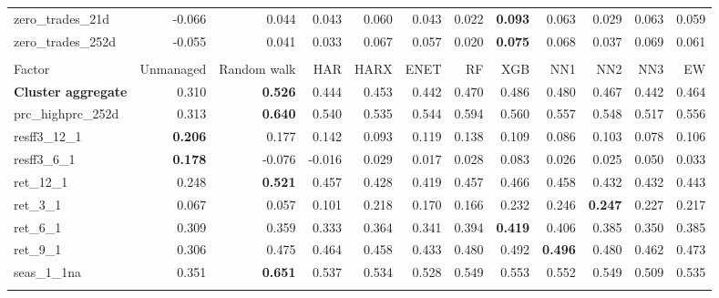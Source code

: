 \begin{landscape}
\begin{longtable}{>{\raggedright\arraybackslash}p{2.6cm}rrrrrrrrrrr}
zero\_trades\_21d & -0.066 & 0.044 & 0.043 & \cellcolor{blue!10}0.060 & 0.043 & 0.022 & \textbf{\cellcolor{blue!10}0.093} & \cellcolor{blue!10}0.063 & 0.029 & \cellcolor{blue!10}0.063 & \cellcolor{blue!10}0.059 \\
zero\_trades\_252d & -0.055 & 0.041 & 0.033 & \cellcolor{blue!10}0.067 & \cellcolor{blue!10}0.057 & 0.020 & \textbf{\cellcolor{blue!10}0.075} & \cellcolor{blue!10}0.068 & 0.037 & \cellcolor{blue!10}0.069 & \cellcolor{blue!10}0.061 \\
\hline
\multicolumn{12}{@{}l}{\textit{Panel F. Momentum}} \\
\hline
Factor & Unmanaged & Random walk & HAR & HARX & ENET & RF & XGB & NN1 & NN2 & NN3 & EW \\
\hline
\textbf{Cluster aggregate} & 0.310 & \textbf{0.526} & 0.444 & 0.453 & 0.442 & 0.470 & 0.486 & 0.480 & 0.467 & 0.442 & 0.464 \\
prc\_highprc\_252d & 0.313 & \textbf{0.640} & 0.540 & 0.535 & 0.544 & 0.594 & 0.560 & 0.557 & 0.548 & 0.517 & 0.556 \\
resff3\_12\_1 & \textbf{0.206} & 0.177 & 0.142 & 0.093 & 0.119 & 0.138 & 0.109 & 0.086 & 0.103 & 0.078 & 0.106 \\
resff3\_6\_1 & \textbf{0.178} & -0.076 & -0.016 & 0.029 & 0.017 & 0.028 & 0.083 & 0.026 & 0.025 & 0.050 & 0.033 \\
ret\_12\_1 & 0.248 & \textbf{0.521} & 0.457 & 0.428 & 0.419 & 0.457 & 0.466 & 0.458 & 0.432 & 0.432 & 0.443 \\
ret\_3\_1 & 0.067 & 0.057 & \cellcolor{blue!10}0.101 & \cellcolor{blue!10}0.218 & \cellcolor{blue!10}0.170 & \cellcolor{blue!10}0.166 & \cellcolor{blue!10}0.232 & \cellcolor{blue!10}0.246 & \textbf{\cellcolor{blue!10}0.247} & \cellcolor{blue!10}0.227 & \cellcolor{blue!10}0.217 \\
ret\_6\_1 & 0.309 & 0.359 & 0.333 & \cellcolor{blue!10}0.364 & 0.341 & \cellcolor{blue!10}0.394 & \textbf{\cellcolor{blue!10}0.419} & \cellcolor{blue!10}0.406 & \cellcolor{blue!10}0.385 & 0.350 & \cellcolor{blue!10}0.385 \\
ret\_9\_1 & 0.306 & 0.475 & 0.464 & 0.458 & 0.433 & \cellcolor{blue!10}0.480 & \cellcolor{blue!10}0.492 & \textbf{\cellcolor{blue!10}0.496} & \cellcolor{blue!10}0.480 & 0.462 & 0.473 \\
seas\_1\_1na & 0.351 & \textbf{0.651} & 0.537 & 0.534 & 0.528 & 0.549 & 0.553 & 0.552 & 0.549 & 0.509 & 0.535 \\
\hline
\multicolumn{12}{@{}l}{\textit{Panel G. Profit Growth}} \\

\end{longtable}
\end{landscape}
